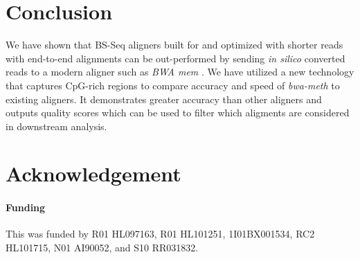 \documentclass{bioinfo}
\begin{document}
%
%






\section{Conclusion}
We have shown that BS-Seq aligners built for and optimized with shorter reads
with end-to-end alignments can be out-performed by sending \emph{in silico}
converted reads to a modern aligner such as \textit{BWA mem} \citep{bwamem}.
We have utilized a new technology that captures CpG-rich regions to compare
accuracy and speed of \textit{bwa-meth} to existing aligners.
It demonstrates greater accuracy than other aligners and outputs quality
scores which can be used to filter which aligments are considered in
downstream analysis.

\section*{Acknowledgement}

\paragraph{Funding\textcolon} This was funded by R01 HL097163, R01 HL101251, 1I01BX001534, RC2 HL101715, N01 AI90052, and S10 RR031832.

%
%
%
%
%
%
%
%
%



    
\end{document}
